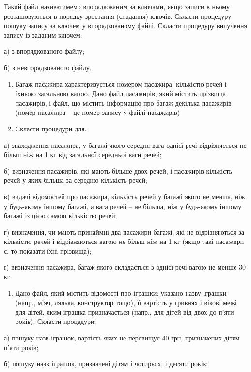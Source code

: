 \documentclass[]{article}
\begin{document}
Такий файл називатимемо впорядкованим за ключами, якщо записи в ньому
розташовуються в порядку зростання (спадання) ключів. Скласти процедуру
пошуку запису за ключем у впорядкованому файлі. Скласти процедуру
вилучення запису із заданим ключем:

а) з впорядкованого файлу;

б) з невпорядкованого файлу.

\begin{enumerate}
\def\labelenumi{\arabic{enumi})}
\item
  Багаж пасажира характеризується номером пасажира, кількістю речей і
  їхньою загальною вагою. Дано файл пасажирів, який містить прізвища
  пасажирів, і файл, що містить інформацію про багаж декілька пасажирів
  (номер пасажира -- це номер запису у файлі пасажирів)
\item
  Скласти процедури для:
\end{enumerate}

а) знаходження пасажира, у багажі якого середня вага однієї речі
відрізняється не більш ніж на 1 кг від загальної середньої ваги речей;

б) визначення пасажирів, які мають більше двох речей, і пасажирів
кількість речей у яких більша за середню кількість речей;

в) видачі відомостей про пасажира, кількість речей у багажі якого не
менша, ніж у будь-якому іншому багажі, а вага речей -- не більша, ніж у
будь-якому іншому багажі із цією самою кількістю речей;

г) визначення, чи мають принаймні два пасажири багажі, які не
відрізняються за кількістю речей і відрізняються вагою не більш ніж на 1
кг (якщо такі пасажири є, то показати їхні прізвища);

ґ) визначення пасажира, багаж якого складається з однієї речі вагою не
менше 30 кг.

\begin{enumerate}
\def\labelenumi{\arabic{enumi})}
\item
  Дано файл, який містить відомості про іграшки: указано назву іграшки
  (напр., м'яч, лялька, конструктор тощо), її вартість у гривнях і
  вікові межі для дітей, яким іграшка призначається (напр., для дітей
  від двох до п'яти років). Скласти процедури:
\end{enumerate}

а) пошуку назв іграшок, вартість яких не перевищує 40 грн, призначених
дітям п'яти років;

б) пошуку назв іграшок, призначені дітям і чотирьох, і десяти років;
\end{document}

